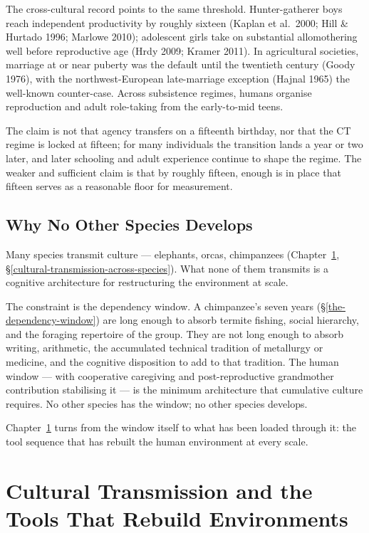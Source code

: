 \documentclass[12pt,letterpaper]{article}
\begin{document}
The cross-cultural record points to the same threshold. Hunter-gatherer
boys reach independent productivity by roughly sixteen (Kaplan et
al.~2000; Hill \& Hurtado 1996; Marlowe 2010); adolescent girls take
on substantial allomothering well before reproductive age (Hrdy 2009;
Kramer 2011). In agricultural societies, marriage at or near puberty
was the default until the twentieth century (Goody 1976), with the
northwest-European late-marriage exception (Hajnal 1965) the
well-known counter-case. Across subsistence regimes, humans organise
reproduction and adult role-taking from the early-to-mid teens.

The claim is not that agency transfers on a fifteenth birthday, nor
that the CT regime is locked at fifteen; for many individuals the
transition lands a year or two later, and later schooling and adult
experience continue to shape the regime. The weaker and sufficient
claim is that by roughly fifteen, enough is in place that fifteen
serves as a reasonable floor for measurement.

\subsection{Why No Other Species Develops}\label{why-no-other-species-develops}

Many species transmit culture --- elephants, orcas, chimpanzees
(Chapter~\ref{cultural-transmission}, \S\ref{cultural-transmission-across-species}).
What none of them transmits is a cognitive architecture for
restructuring the environment at scale.

The constraint is the dependency window. A chimpanzee's seven years
(\S\ref{the-dependency-window}) are long enough to absorb termite fishing,
social hierarchy, and the foraging repertoire of the group. They are not
long enough to absorb writing, arithmetic, the accumulated technical
tradition of metallurgy or medicine, and the cognitive disposition to
add to that tradition. The human window --- with
cooperative caregiving and post-reproductive grandmother contribution
stabilising it --- is the minimum architecture that cumulative culture
requires. No other species has the window; no other species develops.

Chapter~\ref{cultural-transmission} turns from the window itself to
what has been loaded through it: the tool sequence that has rebuilt
the human environment at every scale.

\section{Cultural Transmission and the Tools That Rebuild Environments}\label{cultural-transmission}
\end{document}
